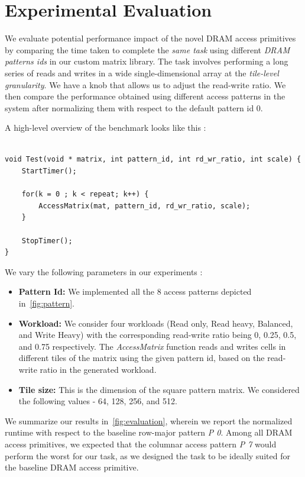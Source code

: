 \documentclass[letterpaper]{article}
\begin{document}
\section{Experimental Evaluation}

We evaluate potential performance impact of the novel DRAM access primitives by
comparing the time taken to complete the \textit{same task} using different
\textit{DRAM patterns ids} in our custom matrix library. 
The task involves performing a long series of reads and writes in a wide
single-dimensional array at the \textit{tile-level granularity}. We have a knob
that allows us to adjust the read-write ratio.
We then compare the performance obtained using different access patterns 
in the system after normalizing them with respect to the default pattern id $0$.

A high-level overview of the benchmark looks like this :

\begin{lstlisting}[caption={Benchmark}]

void Test(void * matrix, int pattern_id, int rd_wr_ratio, int scale) {
    StartTimer();
    
    for(k = 0 ; k < repeat; k++) {
        AccessMatrix(mat, pattern_id, rd_wr_ratio, scale);
    }

    StopTimer();
}

\end{lstlisting}

We vary the following parameters in our experiments :

\begin{itemize}
  \item \textbf{Pattern Id:} We implemented all the 8 access patterns depicted
  in~\cref{fig:pattern}.
  \item \textbf{Workload:} We consider four workloads (Read only, Read heavy,
Balanced, and Write Heavy) with the corresponding read-write ratio being 0,
0.25, 0.5, and 0.75 respectively. The \textit{AccessMatrix} function reads and writes
cells in different tiles of the matrix using the given pattern id, based on the
read-write ratio in the generated workload.
  \item \textbf{Tile size:} This is the dimension of the square pattern matrix. 
  We considered the following values - 64, 128, 256, and 512.
\end{itemize}

We summarize our results in~\cref{fig:evaluation}, wherein we report the
normalized runtime with respect to the baseline row-major pattern \textit{P 0}.
Among all DRAM access primitives, we expected that the columnar access pattern
\textit{P 7} would perform the worst for our task, as we designed the task to
be ideally suited for the baseline DRAM access primitive.
\end{document}
